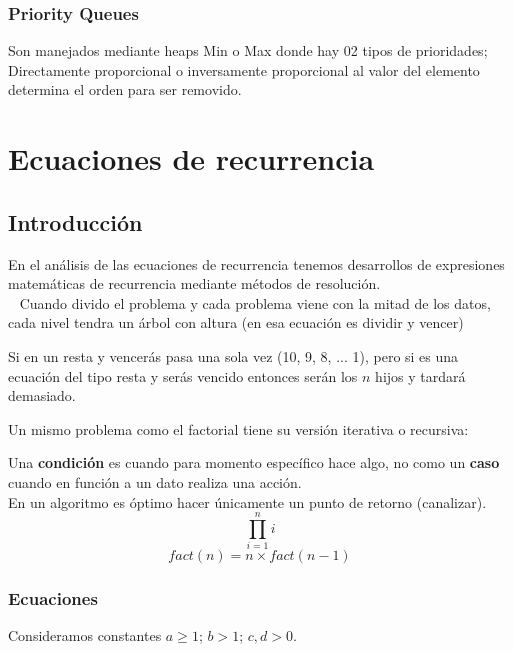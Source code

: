 \documentclass[tikz,11pt,fleqn]{book} %
\begin{document}
\subsection{Priority Queues}
Son manejados mediante heaps Min o Max donde hay 02 tipos de prioridades; Directamente proporcional o inversamente proporcional al valor del elemento determina el orden para ser removido.

    


\chapter{Ecuaciones de recurrencia}

\section{Introducción}
En el análisis de las ecuaciones de recurrencia tenemos desarrollos de expresiones matemáticas de recurrencia mediante métodos de resolución.
\\~
Cuando divido el problema y cada problema viene con la mitad de los datos, cada nivel tendra un árbol con altura (en esa ecuación es dividir y vencer)

Si en un resta y vencerás pasa una sola vez (10, 9, 8, ... 1), pero si es una ecuación del tipo resta y serás vencido entonces serán los $n$ hijos y tardará demasiado.

Un mismo problema como el factorial tiene su versión iterativa o recursiva:

Una \textbf{condición} es cuando para momento específico hace algo, no como un \textbf{caso} cuando en función a un dato realiza una acción.
\\
En un algoritmo es óptimo hacer únicamente un punto de retorno (canalizar).
\\

$$
    \prod_{i=1}^ni
$$
$$
    fact(n)=n\times fact(n-1)
$$

\subsection{Ecuaciones}
Consideramos constantes \( a \ge 1 \); \( b > 1 \); \( c, d > 0 \).
\end{document}
